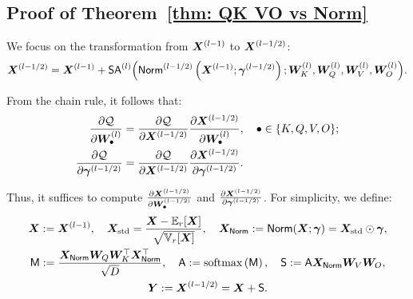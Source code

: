 \subsection{Proof of Theorem~\ref{thm: QK VO vs Norm}}
\label{appendix: proof: thm: QK VO vs Norm}



We focus on the transformation from $\bX^{(l-1)}$ to $\bX^{(l-1/2)}$: 
$$\bX^{(l-1/2)}=\bX^{(l-1)}+\SA^{(l)}\Big(\LN^{(l-1/2)}\left(\bX^{(l-1)};\bgamma^{(l-1/2)}\right);\bW_K^{(l)},\bW_Q^{(l)},\bW_V^{(l)},\bW_O^{(l)}\Big).$$

From the chain rule, it follows that:
\begin{align*}
    \frac{\partial \cQ}{\partial \bW_{\bullet}^{(l)}}&=\frac{\partial \cQ}{\partial \bX^{(l-1/2)}}\frac{\partial \bX^{(l-1/2)}}{\partial \bW_{\bullet}^{(l)}},\quad \bullet\in\{K,Q,V,O\};
    \\
    \frac{\partial \cQ}{\partial \bgamma^{(l-1/2)}}&=\frac{\partial \cQ}{\partial \bX^{(l-1/2)}}\frac{\partial \bX^{(l-1/2)}}{\partial\bgamma^{(l-1/2)}}.
\end{align*}


Thus, it suffices to compute $\frac{\partial \bX^{(l-1/2)}}{\partial\bW_{\bullet}^{(l-1/2)}}$ and $\frac{\partial \bX^{(l-1/2)}}{\partial\bgamma^{(l-1/2)}}$. For simplicity, we define:
\begin{gather*}
    \bX:=\bX^{(l-1)},\quad
    \bX_{\rm std}=\frac{\bX-\bbE_r[\bX]}{\sqrt{\bbV_r[\bX]}},\quad
    \bX_\LN:=\LN(\bX;\bgamma)=\bX_{\rm std}\odot\bgamma,
    \\
    \MSA:=\frac{\bX_{\LN}\bW_Q\bW_K^\top\bX_{\LN}^\top}{\sqrt{D}},\quad
    \ASA:=\sm\left(\MSA\right),\quad
    \SSA:=\ASA\bX_{\LN}\bW_V\bW_O,
    \\
    \bY:=\bX^{(l-1/2)}=\bX+\SSA.
\end{gather*}
 
